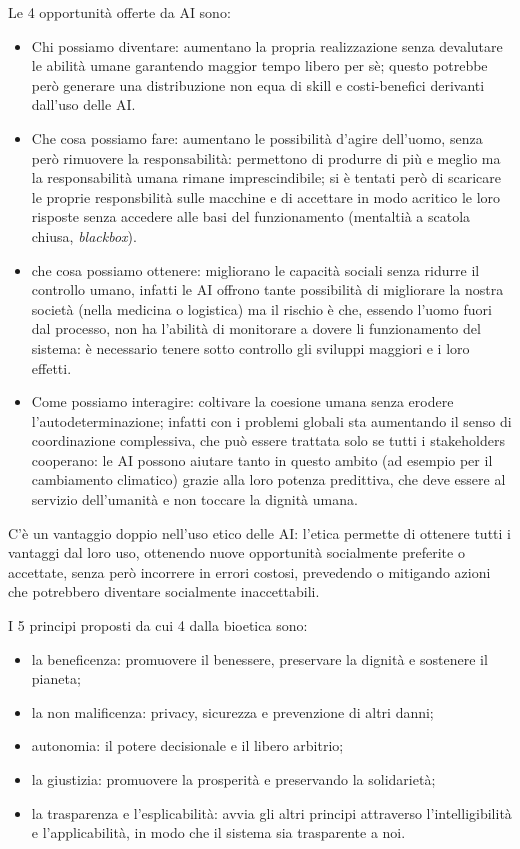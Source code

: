 \documentclass[a4page, 11pt]{article}
\begin{document}
Le 4 opportunità offerte da AI sono:
\begin{itemize}
  \item Chi possiamo diventare: aumentano la propria realizzazione senza devalutare le abilità umane garantendo maggior tempo libero per sè; questo potrebbe però generare una distribuzione non equa di skill e costi-benefici derivanti dall'uso delle AI.
  \item Che cosa possiamo fare: aumentano le possibilità d'agire dell'uomo, senza però rimuovere la responsabilità: permettono di produrre di più e meglio ma la responsabilità umana rimane imprescindibile; si è tentati però di scaricare le proprie responsbilità sulle macchine e di accettare in modo acritico le loro risposte senza accedere alle basi del funzionamento (mentaltià a scatola chiusa, \textit{blackbox}).
  \item che cosa possiamo ottenere: migliorano le capacità sociali senza ridurre il controllo umano, infatti le AI offrono tante possibilità di migliorare la nostra società (nella medicina o logistica) ma il rischio è che, essendo l'uomo fuori dal processo, non ha l'abilità di monitorare a dovere li funzionamento del sistema: è necessario tenere sotto controllo gli sviluppi maggiori e i loro effetti.
  \item Come possiamo interagire: coltivare la coesione umana senza erodere l'autodeterminazione; infatti con i problemi globali sta aumentando il senso di coordinazione complessiva, che può essere trattata solo se tutti i stakeholders cooperano: le AI possono aiutare tanto in questo ambito (ad esempio per il cambiamento climatico) grazie alla loro potenza predittiva, che deve essere al servizio dell'umanità e non toccare la dignità umana.
\end{itemize}

C'è un vantaggio doppio nell'uso etico delle AI: l'etica permette di ottenere tutti i vantaggi dal loro uso, ottenendo nuove opportunità socialmente preferite o accettate, senza però incorrere in errori costosi, prevedendo o mitigando azioni che potrebbero diventare socialmente inaccettabili.

I 5 principi proposti da cui 4 dalla bioetica sono:
\begin{itemize}
  \item la beneficenza: promuovere il benessere, preservare la dignità e sostenere il pianeta;
  \item la non malificenza: privacy, sicurezza e prevenzione di altri danni;
  \item autonomia: il potere decisionale e il libero arbitrio;
  \item la giustizia: promuovere la prosperità e preservando la solidarietà;
  \item la trasparenza e l'esplicabilità: avvia gli altri principi attraverso l'intelligibilità e l'applicabilità, in modo che il sistema sia trasparente a noi.
\end{itemize}
\end{document}
